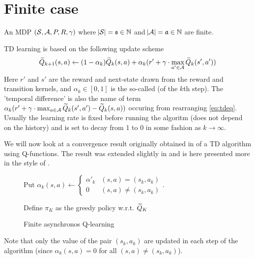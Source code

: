 \section{Finite case}

\begin{sett}
  An MDP $(\mathcal{S}, \mathcal{A}, P, R, \gamma)$ where
  $\abs{\mathcal{S}} = \frak{s} \in \mathbb{N}$ and $\abs{\mathcal{A}} = \frak{a} \in \mathbb{N}$
  are finite.
\end{sett}

TD learning is based on the following
update scheme
\begin{equation}
  \widetilde{Q}_{k+1}(s, a) \leftarrow (1-\alpha_k) \widetilde{Q}_k(s, a)
  + \alpha_k (r' + \gamma \cdot \max_{a' \in \mathcal{A}} \widetilde{Q}_k(s', a'))
  \label{eq:tdeq}
\end{equation}
Here $r'$ and $s'$ are the reward and next-state drawn from the
reward and transition kernels,
and $\alpha_k \in [0,1]$ is the so-called 
(of the $k$th step).
The 'temporal difference' is also the name of term
$ \alpha_k ( r' + \gamma \cdot \max_{a \in \mathcal{A}} \widetilde{Q}_k(s', a')
- \widetilde{Q}_k(s, a) )$ occuring from rearranging \cref{eq:tdeq}.
Usually the learning rate is fixed before running the algoritm
(does not depend on the history) and is set to decay
from 1 to 0 in some fashion as $k \to \infty$.

We will now look at a convergence result originally obtained in
 of a TD algorithm using Q-functions.
The result was extended slightly in  and is here presented
more in the style of .
\begin{figure}[H]
\begin{algorithm}[H] %
  \caption{Finite asynchronos Q-learning}
  Put $\alpha_k(s, a) \leftarrow \begin{cases}
    \alpha'_k & (s, a) = (s_k, a_k)
    \\ 0 & (s, a) \neq (s_k, a_k)
  \end{cases}$.

  Define $\pi_K$ as the greedy policy w.r.t. $\widetilde{Q}_K$ \\
  \label{alg:finAsyncQL}
\end{algorithm}
\end{figure}
Note that only the value of the pair $(s_k, a_k)$ are updated in each
step of the algorithm
(since $\alpha_k(s, a) = 0$ for all $(s,a)\neq(s_k, a_k)$).

